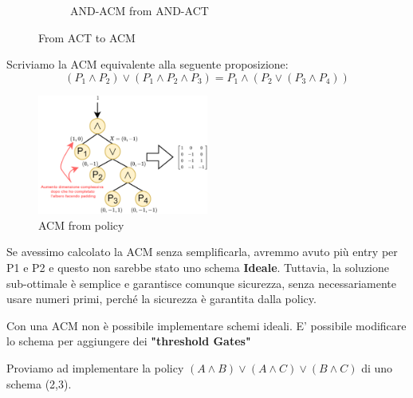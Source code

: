 \begin{figure}[h]
\begin{subfigure}[b]{0.3\textwidth}
         \caption{AND-ACM from AND-ACT }
         \label{fig:and3acm}
     \end{subfigure}
        \caption{From ACT to ACM}
        \label{fig:actacm}
\end{figure}\pagebreak
\begin{example}
Scriviamo la ACM equivalente alla seguente proposizione: \[(P_1\land P_2)\lor (P_1\land P_2\land P_3)=P_1\land(P_2\lor (P_3\land P_4))\]
\begin{figure}[h]
    \centering
    \includegraphics[width=0.5\textwidth]{image/lsss/acmex.png}
    \caption{ACM from policy}
    \label{fig:acmpol}
\end{figure}
\begin{note}
Se avessimo calcolato la ACM senza semplificarla, avremmo avuto più entry per P1 e P2 e questo non sarebbe stato uno schema \textbf{Ideale}. Tuttavia, la soluzione sub-ottimale è semplice e garantisce comunque sicurezza, senza necessariamente usare numeri primi, perché la sicurezza è garantita dalla policy.
\end{note}
\end{example}
\begin{corollary}
Con una ACM non è possibile implementare schemi ideali. E' possibile modificare lo schema per aggiungere dei \textbf{"threshold Gates"}\end{corollary}
\begin{example}
Proviamo ad implementare la policy $(A\land B)\lor(A\land C)\lor(B\land C)$  di uno schema (2,3).
\end{example}